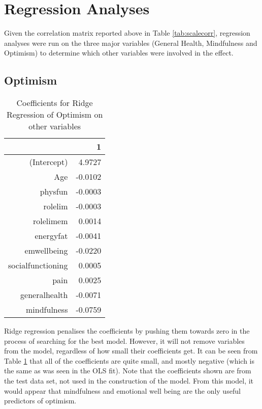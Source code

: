 \documentclass{article}
\begin{document}
\section{Regression Analyses}

Given the correlation matrix reported above in Table \ref{tab:scalecorr}, regression analyses were run on the three major variables (General Health, Mindfulness and Optimism) to determine which other variables were involved in the effect.

\subsection{Optimism}




\begin{table}[ht]
\centering
\begin{tabular}{rr}
  \hline
 & 1 \\ 
  \hline
(Intercept) & 4.9727 \\ 
  Age & -0.0102 \\ 
  physfun & -0.0003 \\ 
  rolelim & -0.0003 \\ 
  rolelimem & 0.0014 \\ 
  energyfat & -0.0041 \\ 
  emwellbeing & -0.0220 \\ 
  socialfunctioning & 0.0005 \\ 
  pain & 0.0025 \\ 
  generalhealth & -0.0071 \\ 
  mindfulness & -0.0759 \\ 
   \hline
\end{tabular}
\caption{Coefficients for Ridge Regression of Optimism on other variables} 
\label{tab:hom1optridge}
\end{table}
Ridge regression penalises the coefficients by pushing them towards zero in the process of searching for the best model. However, it will not remove variables from the model, regardless of how small their coefficients get. It can be seen from Table \ref{tab:hom1optridge} that all of the coefficients are quite small, and mostly negative (which is the same as was seen in the OLS fit). Note that the coefficients shown are from the test data set, not used in the construction of the model. From this model, it would appear that mindfulness and emotional well being are the only useful predictors of optimism. 
\end{document}
